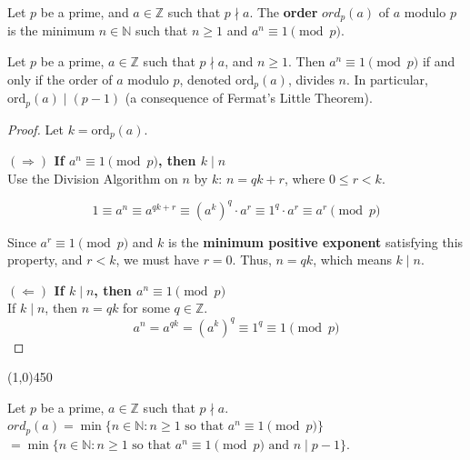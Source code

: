 \bigskip
\begin{definition}
    Let $p$ be a prime, and $a \in \mathbb{Z}$ such that $p \nmid a$.
    The \textbf{order} $ord_{p}(a)$ of $a$ modulo $p$ is the minimum $n \in \mathbb{N}$ such that $n \geq 1$ and $a^{n} \equiv 1 \pmod{p}$.
\end{definition}

\bigskip
\begin{proposition}
    Let $p$ be a prime, $a \in \mathbb{Z}$ such that $p \nmid a$, and $n \ge 1$.
    Then $a^{n} \equiv 1 \pmod{p}$ if and only if the order of $a$ modulo $p$, denoted $\text{ord}_{p}(a)$, divides $n$.
    In particular, $\text{ord}_{p}(a) \mid (p-1)$ (a consequence of Fermat's Little Theorem).
\end{proposition}

\begin{proof}
    Let $k = \text{ord}_{p}(a)$.
    
    \textbf{$(\Rightarrow)$ If $a^{n} \equiv 1 \pmod{p}$, then $k \mid n$} \\
    Use the Division Algorithm on $n$ by $k$: $n = qk + r$, where $0 \le r < k$.
    
    $$1 \equiv a^{n} \equiv a^{qk + r} \equiv (a^{k})^{q} \cdot a^{r} \equiv 1^{q} \cdot a^{r} \equiv a^{r} \pmod{p}$$
    
    Since $a^{r} \equiv 1 \pmod{p}$ and $k$ is the \textbf{minimum positive exponent} satisfying this property, and $r < k$, we must have $r=0$.
    Thus, $n = qk$, which means $k \mid n$.

    \textbf{$(\Leftarrow)$ If $k \mid n$, then $a^{n} \equiv 1 \pmod{p}$} \\
    If $k \mid n$, then $n = qk$ for some $q \in \mathbb{Z}$.
    $$a^{n} = a^{qk} = (a^{k})^{q} \equiv 1^{q} \equiv 1 \pmod{p}$$
\end{proof}

\begin{center}
    \vspace{10pt}
    \line(1,0){450}
    \vspace{25pt}
\end{center}

\begin{corollary}
    Let $p$ be a prime, $a \in \mathbb{Z}$ such that $p \nmid a.$
    $ord_{p}(a) = \min\{n \in \mathbb{N} : n \geq 1 \text{ so that } a^{n} \equiv 1 \pmod{p}\}$
    $= \min\{n \in \mathbb{N} : n \geq 1 \text{ so that } a^{n} \equiv 1 \pmod{p} \text{ and } n \mid p-1\}$.
\end{corollary}

